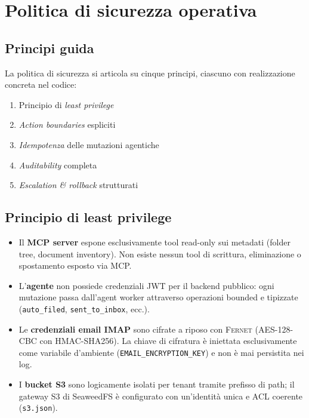 \chapter{Politica di sicurezza operativa}
\label{chap:sicurezza}

\section{Principi guida}
\label{sec:principi}

La politica di sicurezza si articola su cinque principi, ciascuno con realizzazione
concreta nel codice:

\begin{enumerate}[leftmargin=*]
    \item Principio di \emph{least privilege}
    \item \emph{Action boundaries} espliciti
    \item \emph{Idempotenza} delle mutazioni agentiche
    \item \emph{Auditability} completa
    \item \emph{Escalation \& rollback} strutturati
\end{enumerate}

\section{Principio di least privilege}
\label{sec:least_privilege}

\begin{itemize}[leftmargin=*]
    \item Il \textbf{MCP server} espone esclusivamente tool read-only sui metadati
          (folder tree, document inventory). Non esiste nessun tool di scrittura,
          eliminazione o spostamento esposto via MCP.
    \item L'\textbf{agente} non possiede credenziali JWT per il backend pubblico:
          ogni mutazione passa dall'agent worker attraverso operazioni bounded
          e tipizzate (\texttt{auto\_filed}, \texttt{sent\_to\_inbox}, ecc.).
    \item Le \textbf{credenziali email IMAP} sono cifrate a riposo con
          \textsc{Fernet} (AES-128-CBC con HMAC-SHA256). La chiave di cifratura
          \`e iniettata esclusivamente come variabile d'ambiente
          (\texttt{EMAIL\_ENCRYPTION\_KEY}) e non \`e mai persistita nei log.
    \item I \textbf{bucket S3} sono logicamente isolati per tenant tramite prefisso
          di path; il gateway S3 di SeaweedFS \`e configurato con un'identit\`a
          unica e ACL coerente (\texttt{s3.json}).
\end{itemize}

